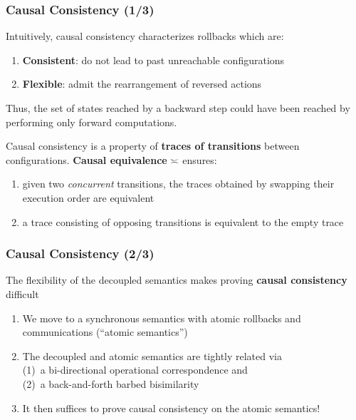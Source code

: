\documentclass[12pt]{beamer}
\newcommand{\bi}{\begin{enumerate}[$\bullet$]}
\newcommand{\ei}{\end{enumerate}}
\begin{document}
\begin{frame}
	\frametitle{Causal Consistency (1/3)}
	
	
	Intuitively, causal consistency characterizes rollbacks which are:
	\bi
		\item \textbf{Consistent}: do not lead to past unreachable configurations
		\item \textbf{Flexible}: admit the rearrangement of reversed actions
		\ei
Thus, the set of states reached by a backward step could have been reached by performing only forward computations.
	
	\bigskip
	\pause
	
	Causal consistency is a property of \textbf{traces of transitions} between configurations.
	\textbf{Causal equivalence} $\asymp$ ensures:
	\bi
	\item given two \emph{concurrent} transitions, the traces obtained by swapping their execution order are equivalent
	\item a trace consisting of opposing transitions is equivalent to the empty trace
	\ei
	
%	


\end{frame}
\begin{frame}
	\frametitle{Causal Consistency (2/3)}
	The flexibility of the decoupled semantics makes proving \textbf{causal consistency} difficult
	\bi
		\item We move to a synchronous semantics with atomic rollbacks and communications (``atomic semantics'')
		\item The decoupled and atomic semantics are tightly related via \\
		(1)~a bi-directional operational correspondence and \\
		(2)~a back-and-forth barbed bisimilarity
		\item It then suffices to prove causal consistency on the atomic semantics!
	\ei
\end{frame}
\end{document}
